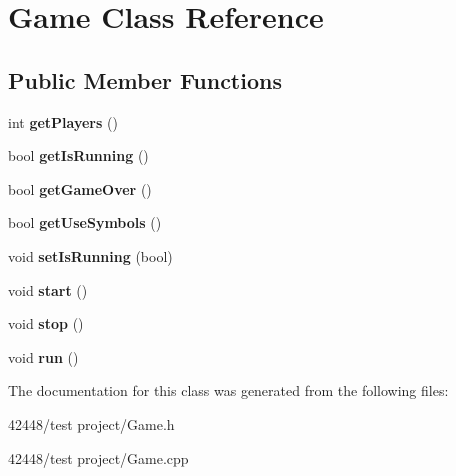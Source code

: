 \hypertarget{class_game}{\section{Game Class Reference}
\label{class_game}
}
\subsection*{Public Member Functions}
\begin{DoxyCompactItemize}
\item 
\hypertarget{class_game_aee3b6eabbe52f211530e0f4da9a06081}{int {\bfseries get\-Players} ()}\label{class_game_aee3b6eabbe52f211530e0f4da9a06081}

\item 
\hypertarget{class_game_a03442bac816f9e80710e628b8b78b3e2}{bool {\bfseries get\-Is\-Running} ()}\label{class_game_a03442bac816f9e80710e628b8b78b3e2}

\item 
\hypertarget{class_game_a2ab13a3be1b7de58174899538c21868a}{bool {\bfseries get\-Game\-Over} ()}\label{class_game_a2ab13a3be1b7de58174899538c21868a}

\item 
\hypertarget{class_game_a79103e8219933eb2460d68e6d54b1bc1}{bool {\bfseries get\-Use\-Symbols} ()}\label{class_game_a79103e8219933eb2460d68e6d54b1bc1}

\item 
\hypertarget{class_game_af0bc0fb1ee696d8dbdf82de52395e2d7}{void {\bfseries set\-Is\-Running} (bool)}\label{class_game_af0bc0fb1ee696d8dbdf82de52395e2d7}

\item 
\hypertarget{class_game_a3d9b98f7c4a96ecf578f75b96c9f0e90}{void {\bfseries start} ()}\label{class_game_a3d9b98f7c4a96ecf578f75b96c9f0e90}

\item 
\hypertarget{class_game_a17fbb36fd4a2085f9ff4f1fa93d7d08b}{void {\bfseries stop} ()}\label{class_game_a17fbb36fd4a2085f9ff4f1fa93d7d08b}

\item 
\hypertarget{class_game_a1ab78f5ed0d5ea879157357cf2fb2afa}{void {\bfseries run} ()}\label{class_game_a1ab78f5ed0d5ea879157357cf2fb2afa}

\end{DoxyCompactItemize}


The documentation for this class was generated from the following files\-:\begin{DoxyCompactItemize}
\item 
42448/test project/Game.\-h\item 
42448/test project/Game.\-cpp\end{DoxyCompactItemize}
